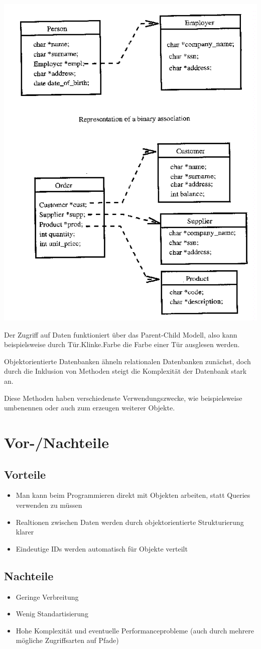 \documentclass{article}
\begin{document}
\includegraphics[scale=0.3]{Attributes.png}

Der Zugriff auf Daten funktioniert über das Parent-Child Modell, also kann beispielsweise durch Tür.Klinke.Farbe die Farbe einer Tür ausglesen werden.

Objektorientierte Datenbanken ähneln relationalen Datenbanken zunächst, doch durch die Inklusion von Methoden steigt die Komplexität der Datenbank stark an.

Diese Methoden haben verschiedenste Verwendungszwecke, wie beispielsweise umbenennen oder auch zum erzeugen weiterer Objekte.


\section{Vor-/Nachteile}
\subsection{Vorteile}
\begin{itemize} 
	\item Man kann beim Programmieren direkt mit Objekten arbeiten, statt Queries verwenden zu müssen
	\item Realtionen zwischen Daten werden durch objektorientierte Strukturierung klarer
	\item Eindeutige IDs werden automatisch für Objekte verteilt
\end{itemize}
\subsection{Nachteile}
\begin{itemize}
	\item Geringe Verbreitung
	\item Wenig Standartisierung
	\item Hohe Komplexität und eventuelle Performanceprobleme (auch durch mehrere mögliche Zugriffsarten auf Pfade)
\end{itemize}
\end{document}
